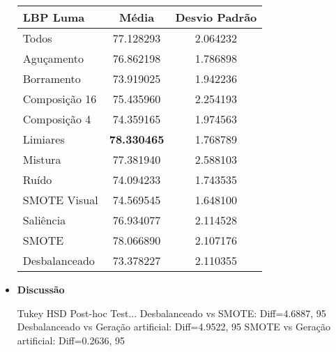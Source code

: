 \begin{itemize}
%
\begin{minipage}{\linewidth}
\begin{table}[H]
\begin{center}
\caption{}
\label{tab:resultados:x:melhor}
\begin{tabular}{|l|c|c|}
\hline
\textbf{LBP Luma} & \textbf{Média}     & \textbf{Desvio Padrão} \\ \hline
   Todos        &  77.128293 &  2.064232  \\ \hline
  Aguçamento    &  76.862198 &  1.786898  \\ \hline
  Borramento    &  73.919025 &  1.942236  \\ \hline
  Composição 16 &  75.435960 &  2.254193  \\ \hline
  Composição 4  &  74.359165 &  1.974563  \\ \hline
  Limiares      &  \textbf{78.330465} &  1.768789  \\ \hline
  Mistura       &  77.381940 &  2.588103  \\ \hline
  Ruído         &  74.094233 &  1.743535  \\ \hline
  SMOTE Visual  &  74.569545 &  1.648100  \\ \hline
  Saliência     &  76.934077 &  2.114528  \\ \hline
 SMOTE          &  78.066890 &  2.107176  \\ \hline
Desbalanceado   &  73.378227 &  2.110355  \\ \hline
\end{tabular}
\end{center}
\end{table}
\end{minipage}

\item[] \textbf{Discussão}

Tukey HSD Post-hoc Test...
Desbalanceado vs SMOTE: Diff=4.6887, 95%
Desbalanceado vs Geração artificial: Diff=4.9522, 95%
SMOTE vs Geração artificial: Diff=0.2636, 95%

\end{itemize}

